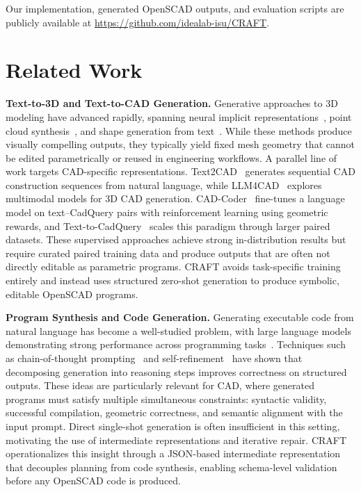 \documentclass[conference]{IEEEtran}
\begin{document}
Our implementation, generated OpenSCAD outputs, and evaluation scripts are publicly available at \url{https://github.com/idealab-isu/CRAFT}.

\section{Related Work}
\label{Sec:related}

\textbf{Text-to-3D and Text-to-CAD Generation.} Generative approaches to 3D modeling have advanced rapidly, spanning neural implicit representations~\citep{poole2023dreamfusion}, point cloud synthesis~\citep{nichol2022pointe}, and shape generation from text~\citep{jun2023shape}. While these methods produce visually compelling outputs, they typically yield fixed mesh geometry that cannot be edited parametrically or reused in engineering workflows. A parallel line of work targets CAD-specific representations. Text2CAD~\citep{text2cad2024} generates sequential CAD construction sequences from natural language, while LLM4CAD~\citep{li2025llm4cad} explores multimodal models for 3D CAD generation. CAD-Coder~\citep{cadcoder2025} fine-tunes a language model on text--CadQuery pairs with reinforcement learning using geometric rewards, and Text-to-CadQuery~\citep{text2cadquery2025} scales this paradigm through larger paired datasets. These supervised approaches achieve strong in-distribution results but require curated paired training data and produce outputs that are often not directly editable as parametric programs. CRAFT avoids task-specific training entirely and instead uses structured zero-shot generation to produce symbolic, editable OpenSCAD programs.

\textbf{Program Synthesis and Code Generation.} Generating executable code from natural language has become a well-studied problem, with large language models demonstrating strong performance across programming tasks~\citep{chen2021codex}. Techniques such as chain-of-thought prompting~\citep{wei2022chainofthought} and self-refinement~\citep{madaan2023selfrefine} have shown that decomposing generation into reasoning steps improves correctness on structured outputs. These ideas are particularly relevant for CAD, where generated programs must satisfy multiple simultaneous constraints: syntactic validity, successful compilation, geometric correctness, and semantic alignment with the input prompt. Direct single-shot generation is often insufficient in this setting, motivating the use of intermediate representations and iterative repair. CRAFT operationalizes this insight through a JSON-based intermediate representation that decouples planning from code synthesis, enabling schema-level validation before any OpenSCAD code is produced.
\end{document}
